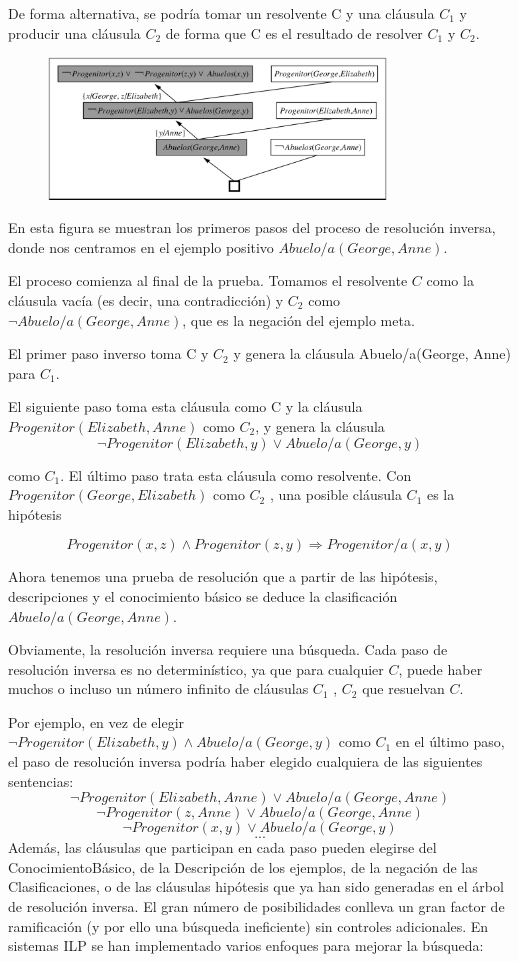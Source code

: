 \documentclass[12 pt, a4paper]{article}
\begin{document}
		De forma alternativa, se podría tomar un resolvente C y una cláusula $C_{1}$ y producir una cláusula $C_{2}$ de forma que C es el resultado de resolver $C_{1}$ y $C_{2}$.
			\begin{figure}[h]
					\centering
					\includegraphics[width=0.8\textwidth]{./section3/fig8.png}
				\end{figure}		
		En esta figura se muestran los primeros pasos del proceso de resolución inversa, donde nos centramos en el ejemplo positivo $Abuelo/a(George, Anne)$. 
		
		El proceso comienza al final de la prueba.
Tomamos el resolvente $C$ como la cláusula vacía (es decir, una contradicción) y $C_{2}$ como $\neg Abuelo/a(George, Anne)$, que es la negación del ejemplo meta. 

		El primer paso inverso toma C y $C_{2}$ y genera la cláusula Abuelo/a(George, Anne) para $C_{1}$. 
		
		El siguiente paso toma esta cláusula como C y la cláusula $Progenitor(Elizabeth, Anne)$ como $C_{2}$, y genera la cláusula
			$$\neg Progenitor(Elizabeth, y) \lor Abuelo/a(George,y)$$

		como $C_{1}$. El último paso trata esta cláusula como resolvente. Con $Progenitor(George,Elizabeth)$ como $C_{2}$ , una posible cláusula $C_{1}$ es la hipótesis
			
			$$Progenitor(x, z) \land Progenitor(z, y) \Rightarrow Progenitor/a(x, y)$$
		
		Ahora tenemos una prueba de resolución que a partir de las hipótesis, descripciones y el conocimiento básico se deduce la clasificación $Abuelo/a(George, Anne)$.

		Obviamente, la resolución inversa requiere una búsqueda. 
Cada paso de resolución inversa es no determinístico, ya que para cualquier $C$, puede haber muchos o incluso un número infinito de cláusulas $C_{1}$ , $C_{2}$ que resuelvan $C$. 
		
		Por ejemplo, en vez de elegir $\neg Progenitor(Elizabeth, y) \land Abuelo/a(George, y)$ como $C_{1}$ en el último paso, el paso de resolución inversa podría haber elegido cualquiera de las siguientes sentencias:
				$$\neg Progenitor(Elizabeth, Anne) \lor Abuelo/a(George, Anne)$$
				$$\neg Progenitor(z, Anne) \lor Abuelo/a(George, Anne)$$
				$$\neg Progenitor(x, y)\lor Abuelo/a(George, y)$$
				$$...$$ 
			Además, las cláusulas que participan en cada paso pueden elegirse del ConocimientoBásico, de la Descripción de los ejemplos, de la negación de las Clasificaciones, o de las cláusulas hipótesis que ya han sido generadas en el árbol de resolución inversa. El gran número de posibilidades conlleva un gran factor de ramificación (y por ello una búsqueda ineficiente) sin controles adicionales. En sistemas ILP se han implementado varios enfoques para mejorar la búsqueda:
			
\end{document}
